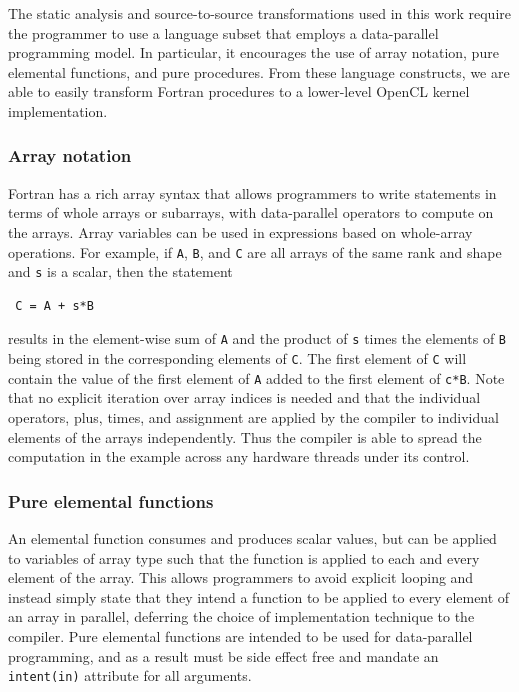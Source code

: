 The static analysis and source-to-source transformations used in this work
require the programmer to use a language subset that employs a data-parallel
programming model.  In particular, it encourages the use of array notation,
pure elemental functions, and pure procedures.  From these language constructs, we
are able to easily transform Fortran procedures to a lower-level OpenCL kernel
implementation.

\subsubsection*{Array notation}

Fortran has a rich array syntax that allows programmers to write statements in
terms of whole arrays or subarrays, with data-parallel operators to compute on
the arrays.  Array variables can be used in expressions based on whole-array
operations.  For example, if {\tt A}, {\tt B}, and {\tt C} are all arrays of the
same rank and shape and {\tt s} is a scalar, then the statement

{\small
\begin{verbatim}
 C = A + s*B
\end{verbatim}
}

\noindent
results in the element-wise sum of {\tt A} and the product of {\tt s} times the
elements of {\tt B} being stored in the corresponding elements of {\tt C}. The
first element of {\tt C} will contain the value of the first element of {\tt A}
added to the first element of {\tt c*B}.  Note that no explicit iteration over
array indices is needed and that the individual operators, plus, times, and
assignment are applied by the compiler to individual elements of the arrays
independently.  Thus the compiler is able to spread the computation in the
example across any hardware threads under its control.

\subsubsection*{Pure elemental functions}

An elemental function consumes and produces scalar values, but can be applied to
variables of array type such that the function is applied to each and every
element of the array.  This allows programmers to avoid explicit looping and
instead simply state that they intend a function to be applied to every element
of an array in parallel, deferring the choice of implementation technique to the
compiler.  Pure elemental functions are intended to be used for data-parallel
programming, and as a result must be side effect free and mandate an {\tt
intent(in)} attribute for all arguments. 

